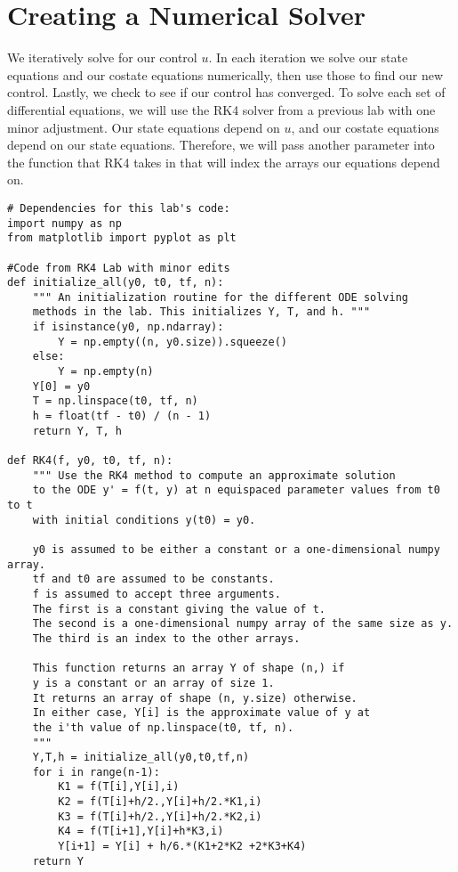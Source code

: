 \section*{Creating a Numerical Solver}

We iteratively solve for our control $u$.
In each iteration we solve our state equations and our costate equations numerically, then use those to find our new control.
Lastly, we check to see if our control has converged.
To solve each set of differential equations, we will use the RK4 solver from a previous lab with one minor adjustment.
Our state equations depend on $u$, and our costate equations depend on our state equations.
Therefore, we will pass another parameter into the function that RK4 takes in that will index the arrays our equations depend on.

\begin{lstlisting}
# Dependencies for this lab's code:
import numpy as np
from matplotlib import pyplot as plt

#Code from RK4 Lab with minor edits				
def initialize_all(y0, t0, tf, n):
    """ An initialization routine for the different ODE solving
    methods in the lab. This initializes Y, T, and h. """
    if isinstance(y0, np.ndarray):
        Y = np.empty((n, y0.size)).squeeze()
    else:
        Y = np.empty(n)
    Y[0] = y0
    T = np.linspace(t0, tf, n)
    h = float(tf - t0) / (n - 1)
    return Y, T, h

def RK4(f, y0, t0, tf, n):
    """ Use the RK4 method to compute an approximate solution
    to the ODE y' = f(t, y) at n equispaced parameter values from t0 to t
    with initial conditions y(t0) = y0.
    
    y0 is assumed to be either a constant or a one-dimensional numpy array.
    tf and t0 are assumed to be constants.
    f is assumed to accept three arguments.
    The first is a constant giving the value of t.
    The second is a one-dimensional numpy array of the same size as y.
    The third is an index to the other arrays.
    
    This function returns an array Y of shape (n,) if
    y is a constant or an array of size 1.
    It returns an array of shape (n, y.size) otherwise.
    In either case, Y[i] is the approximate value of y at
    the i'th value of np.linspace(t0, tf, n).
    """
    Y,T,h = initialize_all(y0,t0,tf,n)
    for i in range(n-1):
        K1 = f(T[i],Y[i],i)
        K2 = f(T[i]+h/2.,Y[i]+h/2.*K1,i)
        K3 = f(T[i]+h/2.,Y[i]+h/2.*K2,i)
        K4 = f(T[i+1],Y[i]+h*K3,i)
        Y[i+1] = Y[i] + h/6.*(K1+2*K2 +2*K3+K4)
    return Y
\end{lstlisting}

